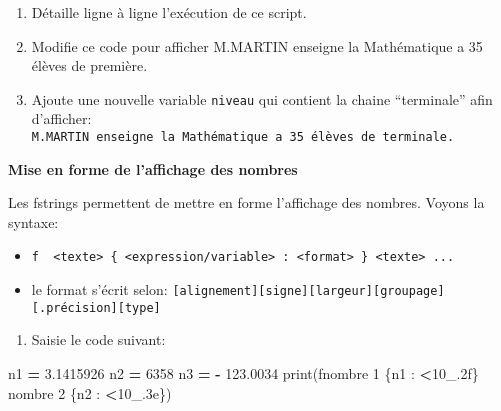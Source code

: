 \documentclass[
]{book}
\newenvironment{Shaded}{\begin{snugshade}}{\end{snugshade}}
\newcommand{\BuiltInTok}[1]{#1}
\newcommand{\DecValTok}[1]{\textcolor[rgb]{0.00,0.00,0.81}{#1}}
\newcommand{\FloatTok}[1]{\textcolor[rgb]{0.00,0.00,0.81}{#1}}
\newcommand{\NormalTok}[1]{#1}
\newcommand{\OperatorTok}[1]{\textcolor[rgb]{0.81,0.36,0.00}{\textbf{#1}}}
\newcommand{\SpecialCharTok}[1]{\textcolor[rgb]{0.00,0.00,0.00}{#1}}
\newcommand{\SpecialStringTok}[1]{\textcolor[rgb]{0.31,0.60,0.02}{#1}}
\providecommand{\tightlist}{%
  \setlength{\itemsep}{0pt}\setlength{\parskip}{0pt}}
\def\tightlist{}
\begin{document}
\begin{enumerate}
\def\labelenumi{\arabic{enumi}.}
\setcounter{enumi}{1}
\tightlist
\item
  Détaille ligne à ligne l'exécution de ce script.
\item
  Modifie ce code pour afficher M.MARTIN enseigne la Mathématique a 35 élèves de première.
\item
  Ajoute une nouvelle variable \texttt{niveau} qui contient la chaine ``terminale'' afin d'afficher: \texttt{M.MARTIN\ enseigne\ la\ Mathématique\ a\ 35\ élèves\ de\ terminale.}
\end{enumerate}

\textbf{Mise en forme de l'affichage des nombres}

Les fstrings permettent de mettre en forme l'affichage des nombres. Voyons la syntaxe:

\begin{itemize}
\tightlist
\item
  \texttt{f\ \textquotesingle{}\ \textless{}texte\textgreater{}\ \{\ \textless{}expression/variable\textgreater{}\ :\ \textless{}format\textgreater{}\ \}\ \textless{}texte\textgreater{}\ ...\ \textquotesingle{}}
\item
  le format s'écrit selon: \texttt{{[}alignement{]}{[}signe{]}{[}largeur{]}{[}groupage{]}{[}.précision{]}{[}type{]}}
\end{itemize}

\begin{enumerate}
\def\labelenumi{\arabic{enumi}.}
\tightlist
\item
  Saisie le code suivant:
\end{enumerate}

\begin{Shaded}
\begin{Highlighting}[]
\NormalTok{n1 }\OperatorTok{=} \FloatTok{3.1415926}
\NormalTok{n2 }\OperatorTok{=} \DecValTok{6358}
\NormalTok{n3 }\OperatorTok{=} \OperatorTok{{-}} \FloatTok{123.0034}
\BuiltInTok{print}\NormalTok{(}\SpecialStringTok{f\textquotesingle{}nombre 1 }\SpecialCharTok{\{n1} \SpecialCharTok{:} \OperatorTok{\textless{}}\DecValTok{10}\SpecialCharTok{\_}\FloatTok{.2}\SpecialCharTok{f\}}\SpecialStringTok{ nombre 2 }\SpecialCharTok{\{n2} \SpecialCharTok{:} \OperatorTok{\textless{}}\DecValTok{10}\SpecialCharTok{\_}\FloatTok{.3}\SpecialCharTok{e\}}\SpecialStringTok{\textquotesingle{}}\NormalTok{)}
\end{Highlighting}
\end{Shaded}
\end{document}
